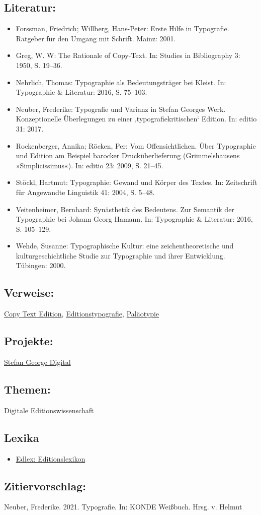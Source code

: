 \documentclass{article}
\begin{document}
        \subsection*{Literatur:}\begin{itemize}\item Forssman, Friedrich; Willberg, Hans-Peter: Erste Hilfe in Typografie. Ratgeber für den Umgang mit Schrift. Mainz: 2001.\item Greg, W. W: The Rationale of Copy-Text. In: Studies in Bibliography 3: 1950, S. 19–36.\item Nehrlich, Thomas: Typographie als Bedeutungsträger bei Kleist. In: Typographie & Literatur: 2016, S. 75–103.\item Neuber, Frederike: Typografie und Varianz in Stefan Georges Werk. Konzeptionelle Überlegungen zu einer ,typografiekritischen‘ Edition. In: editio 31: 2017.\item Rockenberger, Annika; Röcken, Per: Vom Offensichtlichen. Über Typographie und Edition am Beispiel barocker Drucküberlieferung (Grimmelshausens »Simplicissimus«). In: editio 23: 2009, S. 21–45.\item Stöckl, Hartmut: Typographie: Gewand und Körper des Textes. In: Zeitschrift für Angewandte Linguistik 41: 2004, S. 5–48.\item Veitenheimer, Bernhard: Synästhetik des Bedeutens. Zur Semantik der Typographie bei Johann Georg Hamann. In: Typographie & Literatur: 2016, S. 105–129.\item Wehde, Susanne: Typographische Kultur: eine zeichentheoretische und kulturgeschichtliche Studie zur Typographie und ihrer Entwicklung. Tübingen: 2000.\end{itemize}\subsection*{Verweise:}\href{https://gams.uni-graz.at/o:konde.43}{Copy Text Edition}, \href{https://gams.uni-graz.at/o:konde.77}{Editionstypografie}, \href{https://gams.uni-graz.at/o:konde.221}{Paläotypie}\subsection*{Projekte:}\href{http://gams.uni-graz.at/context:stgd¡}{Stefan George Digital}\subsection*{Themen:}Digitale Editionswissenschaft\subsection*{Lexika}\begin{itemize}\item \href{https://edlex.de/index.php?title=Typografie}{Edlex: Editionslexikon}\end{itemize}\subsection*{Zitiervorschlag:}Neuber, Frederike. 2021. Typografie. In: KONDE Weißbuch. Hrsg. v. Helmut 
\end{document}
